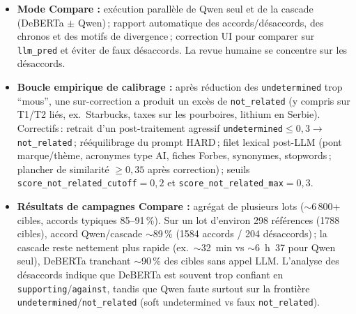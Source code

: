 \begin{itemize}
    \item \textbf{Mode Compare :} exécution parallèle de Qwen seul et de la cascade (DeBERTa $\pm$ Qwen)\,; rapport automatique des accords/désaccords, des chronos et des motifs de divergence\,; correction UI pour comparer sur \texttt{llm\_pred} et éviter de faux désaccords. La revue humaine se concentre sur les désaccords.

    \item \textbf{Boucle empirique de calibrage :} après réduction des \texttt{undetermined} trop ``mous'', une sur-correction a produit un excès de \texttt{not\_related} (y compris sur T1/T2 liés, ex.\ Starbucks, taxes sur les pourboires, lithium en Serbie). Correctifs\,: retrait d'un post-traitement agressif \texttt{undetermined}$\le 0{,}3\to$\texttt{not\_related}\,; rééquilibrage du prompt HARD\,; filet lexical post-LLM (pont marque/thème, acronymes type AI, fiches Forbes, synonymes, stopwords\,; plancher de similarité $\ge 0{,}35$ après correction)\,; seuils \texttt{score\_not\_related\_cutoff}$=0{,}2$ et \texttt{score\_not\_related\_max}$=0{,}3$.

    \item \textbf{Résultats de campagnes Compare :} agrégat de plusieurs lots ($\sim$6\,800+ cibles, accords typiques 85--91\,\%).
          Sur un lot d'environ 298 références (1788 cibles), accord Qwen/cascade $\sim$89\,\% (1584 accords / 204 désaccords)\,; la cascade reste nettement plus rapide (ex.\ $\sim$32~min vs $\sim$6~h~37 pour Qwen seul), DeBERTa tranchant $\sim$90\,\% des cibles sans appel LLM. L'analyse des désaccords indique que DeBERTa est souvent trop confiant en \texttt{supporting}/\texttt{against}, tandis que Qwen faute surtout sur la frontière \texttt{undetermined}/\texttt{not\_related} (soft undetermined vs faux \texttt{not\_related}).
\end{itemize}

